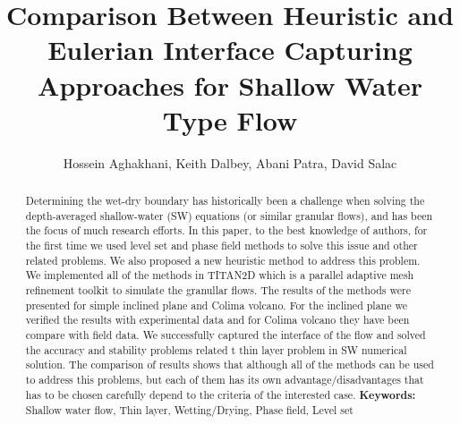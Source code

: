 \documentclass[letterpaper,10pt]{article}
\title{Comparison Between Heuristic and Eulerian Interface Capturing Approaches for Shallow Water Type Flow}
\author{Hossein Aghakhani, Keith Dalbey, Abani Patra, David Salac}
\date{}
\begin{document}
\maketitle

\begin {abstract}{
Determining the wet-dry boundary has historically been a challenge when 
solving the depth-averaged shallow-water (SW) equations (or similar granular flows), and has 
been the focus of much research efforts. In this paper, to the best knowledge of authors, for the first time we used level set and phase field methods to solve this issue and other related problems. We also proposed a new heuristic method to address this problem. We implemented all of the methods in TITAN2D which is a parallel adaptive mesh refinement toolkit to simulate the granullar flows.\newline
The results of the methods were presented for simple inclined plane and Colima volcano. For the inclined plane we verified the results with experimental data and for Colima volcano they have been compare with field data. We successfully captured the interface of the flow and solved the accuracy and stability problems related t thin layer problem in SW numerical solution. The comparison of results shows that although all of the methods can be used to address this problems, but each of them has its own advantage/disadvantages that has to be chosen carefully depend to the criteria of the interested case.\newline
\textbf{Keywords:} Shallow water flow, Thin layer, Wetting/Drying, Phase field, Level set}
\end{abstract}

\end{document}
